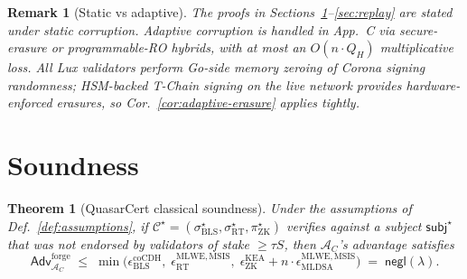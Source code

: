 \documentclass[11pt]{article}
\newtheorem{theorem}{Theorem}
\newtheorem{remark}{Remark}
\begin{document}
\begin{remark}[Static vs adaptive]
The proofs in Sections~\ref{sec:soundness}--\ref{sec:replay} are stated
under \emph{static} corruption.  Adaptive corruption is handled in
App.~C via secure-erasure or programmable-RO hybrids, with at most an
$O(n \cdot Q_H)$ multiplicative loss.  All Lux validators perform
Go-side memory zeroing of Corona signing randomness; HSM-backed
T-Chain signing on the live network provides hardware-enforced
erasures, so Cor.~\ref{cor:adaptive-erasure} applies tightly.
\end{remark}

\section{Soundness}
\label{sec:soundness}

\begin{theorem}[QuasarCert classical soundness]
\label{thm:main}
Under the assumptions of Def.~\ref{def:assumptions}, if
$\mathcal{C}^\star = (\sigma_{\mathrm{BLS}}^\star,
\sigma_{\mathrm{RT}}^\star, \pi_{\mathrm{ZK}}^\star)$ verifies against a
subject $\mathsf{subj}^\star$ that was not endorsed by validators of
stake $\geq \tau S$, then $\mathcal{A}_C$'s advantage satisfies
\[
  \mathsf{Adv}^{\mathrm{forge}}_{\mathcal{A}_C}
  \;\leq\;
  \min\!\bigl(
    \epsilon_{\mathrm{BLS}}^{\mathrm{coCDH}},\;
    \epsilon_{\mathrm{RT}}^{\mathrm{MLWE,MSIS}},\;
    \epsilon_{\mathrm{ZK}}^{\mathrm{KEA}} +
    n \cdot \epsilon_{\mathrm{MLDSA}}^{\mathrm{MLWE,MSIS}}
  \bigr)
  \;=\; \mathsf{negl}(\lambda).
\]
\end{theorem}
\end{document}
